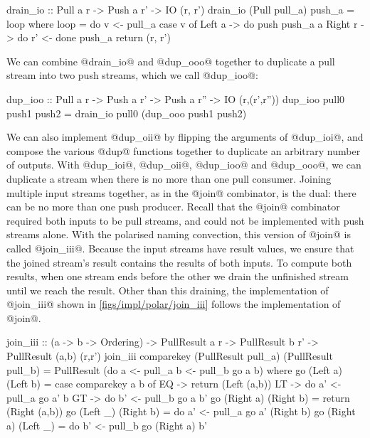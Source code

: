 \begin{haskell}
drain_io :: Pull a r -> Push a r' -> IO (r, r')
drain_io (Pull pull_a) push_a = loop
 where
  loop = do
    v <- pull_a
    case v of
     Left a -> do
      push push_a a
     Right r -> do
      r' <- done push_a
      return (r, r')
\end{haskell}

We can combine @drain_io@ and @dup_ooo@ together to duplicate a pull stream into two push streams, which we call @dup_ioo@:
\newpage

\begin{haskell}
dup_ioo :: Pull a r -> Push a r' -> Push a r'' -> IO (r,(r',r''))
dup_ioo pull0 push1 push2 = drain_io pull0 (dup_ooo push1 push2)
\end{haskell}

We can also implement @dup_oii@ by flipping the arguments of @dup_ioi@, and compose the various @dup@ functions together to duplicate an arbitrary number of outputs.
With @dup_ioi@, @dup_oii@, @dup_ioo@ and @dup_ooo@, we can duplicate a stream when there is no more than one pull consumer.
Joining multiple input streams together, as in the @join@ combinator, is the dual: there can be no more than one push producer.
Recall that the @join@ combinator required both inputs to be pull streams, and could not be implemented with push streams alone.
With the polarised naming convection, this version of @join@ is called @join_iii@.
Because the input streams have result values, we ensure that the joined stream's result contains the results of both inputs.
To compute both results, when one stream ends before the other we drain the unfinished stream until we reach the result.
Other than this draining, the implementation of @join_iii@ shown in \cref{figs/impl/polar/join_iii} follows the implementation of @join@.

\begin{haskell}[float,caption=Polarised implementation of \Hs/join_iii/,label=figs/impl/polar/join_iii]
join_iii :: (a -> b -> Ordering) -> PullResult a r
         -> PullResult b r'      -> PullResult (a,b) (r,r')
join_iii comparekey (PullResult pull_a) (PullResult pull_b) = PullResult (do
   a <- pull_a
   b <- pull_b
   go a b)
 where
  go (Left a) (Left b)
   = case comparekey a b of
      EQ -> return (Left (a,b))
      LT -> do
        a' <- pull_a
        go a' b
      GT -> do
        b' <- pull_b
        go a b'
  go (Right a) (Right b) = return (Right (a,b))
  go (Left _) (Right b) = do
    a' <- pull_a
    go a' (Right b)
  go (Right a) (Left _) = do
    b' <- pull_b
    go (Right a) b'
\end{haskell}

